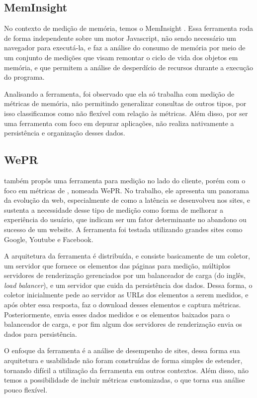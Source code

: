 \documentclass[12pt]{tcc}
\begin{document}
		\subsection{MemInsight}
		\par No contexto de medição de memória, temos o MemInsight \citep{Jensen2015MemInsight}. Essa ferramenta roda de forma independente sobre um motor Javascript, não sendo necessário um navegador para executá-la, e faz a análise do consumo de memória por meio de um conjunto de medições que visam remontar o ciclo de vida dos objetos em memória, e que permitem a análise de desperdício de recursos durante a execução do programa. 
		\par Analisando a ferramenta, foi observado que ela só trabalha com medição de métricas de memória, não permitindo generalizar consultas de outros tipos, por isso classificamos como não flexível com relação às métricas. Além disso, por ser uma ferramenta com foco em depurar aplicações, não realiza nativamente a persistência e organização desses dados.
		

		\subsection{WePR}
		\label{WePR}
		\par \citet{Asrese2019MeasuringWL} também propôs uma ferramenta para medição no lado do cliente, porém com o foco em métricas de , nomeada WePR. No trabalho, ele apresenta um panorama da evolução da web, especialmente de como a latência se desenvolveu nos sites, e sustenta a necessidade desse tipo de medição como forma de melhorar a experiência do usuário, que indicam ser um fator determinante no abandono ou sucesso de um website. A ferramenta foi testada utilizando grandes sites como Google, Youtube e Facebook. 
		\par A arquitetura da ferramenta é distribuída, e consiste basicamente de um coletor, um servidor que fornece os elementos das páginas para medição, múltiplos servidores de renderização gerenciados por um balanceador de carga (do inglês, \emph{load balancer}), e um servidor que cuida da persistência dos dados. Dessa forma, o coletor inicialmente pede ao servidor as URLs dos elementos a serem medidos, e após obter essa resposta, faz o download desses elementos e captura métricas. Posteriormente, envia esses dados medidos e os elementos baixados para o balanceador de carga, e por fim algum dos servidores de renderização envia os dados para persistência.
		\par O enfoque da ferramenta é a análise de desempenho de sites, dessa forma sua arquitetura e usabilidade não foram construídas de forma simples de estender, tornando difícil a utilização da ferramenta em outros contextos. Além disso, não temos a possibilidade de incluir métricas customizadas, o que torna sua análise pouco flexível.
		
\end{document}
